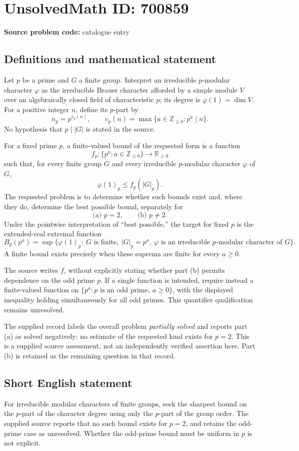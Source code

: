\documentclass[11pt]{article}
\newcommand{\Z}{\mathbb{Z}}
\newcommand{\R}{\mathbb{R}}
\begin{document}
\section*{UnsolvedMath ID: 700859}
\textbf{Source problem code:} catalogue entry
\subsection{Definitions and mathematical statement}
Let \(p\) be a prime and \(G\) a finite group. Interpret an irreducible \(p\)-modular character \(\varphi\) as the irreducible Brauer character afforded by a simple module \(V\) over an algebraically closed field of characteristic \(p\); its degree is \(\varphi(1)=\dim V\). For a positive integer \(n\), define its \(p\)-part by
\[
 n_p=p^{v_p(n)},\qquad v_p(n)=\max\{a\in\Z_{\geq0}:p^a\mid n\}.
\]
No hypothesis that \(p\mid |G|\) is stated in the source.

For a fixed prime \(p\), a finite-valued bound of the requested form is a function
\[
 f_p:\{p^a:a\in\Z_{\geq0}\}\longrightarrow\R_{\geq0}
\]
such that, for every finite group \(G\) and every irreducible \(p\)-modular character \(\varphi\) of \(G\),
\[
 \varphi(1)_p\leq f_p(|G|_p).
\]
The requested problem is to determine whether such bounds exist and, where they do, determine the best possible bound, separately for
\[
 \text{(a) }p=2,\qquad \text{(b) }p\ne2.
\]
Under the pointwise interpretation of ``best possible,'' the target for fixed \(p\) is the extended-real extremal function
\[
 B_p(p^a)=\sup\bigl\{\varphi(1)_p:\ G\text{ is finite},\ |G|_p=p^a,\ \varphi\text{ is an irreducible }p\text{-modular character of }G\bigr\}.
\]
A finite bound exists precisely when these suprema are finite for every \(a\geq0\).

The source writes \(f\), without explicitly stating whether part (b) permits dependence on the odd prime \(p\). If a single function is intended, require instead a finite-valued function on \(\{p^a:p\text{ is an odd prime},\ a\geq0\}\), with the displayed inequality holding simultaneously for all odd primes. This quantifier qualification remains unresolved.

The supplied record labels the overall problem \emph{partially solved} and reports part (a) as solved negatively: no estimate of the requested kind exists for \(p=2\). This is a supplied source assessment, not an independently verified assertion here. Part (b) is retained as the remaining question in that record.
\subsection{Short English statement}
For irreducible modular characters of finite groups, seek the sharpest bound on the \(p\)-part of the character degree using only the \(p\)-part of the group order. The supplied source reports that no such bound exists for \(p=2\), and retains the odd-prime case as unresolved. Whether the odd-prime bound must be uniform in \(p\) is not explicit.
\end{document}
